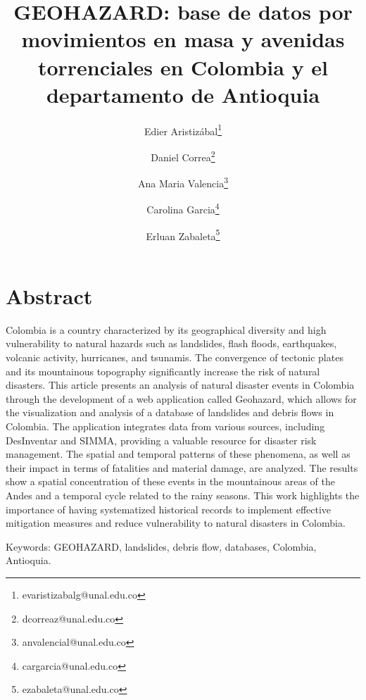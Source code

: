 \documentclass{article}
\title{ \Large \bf GEOHAZARD: base de datos por movimientos en masa y avenidas torrenciales en Colombia y el departamento de Antioquia}
\author[]{Edier Aristizábal\thanks{evaristizabalg@unal.edu.co}}
\author[]{Daniel Correa\thanks{dcorreaz@unal.edu.co}}
\author[]{Ana Maria Valencia\thanks{anvalencial@unal.edu.co}}
\author[]{Carolina Garcia\thanks{cargarcia@unal.edu.co}}
\author[]{Erluan Zabaleta\thanks{ezabaleta@unal.edu.co}}
\affil[]{Departamento de Geociencias y Medio Ambiente, Universidad Nacional de Colombia}
\date{}
\begin{document}
\maketitle

\section*{Abstract}
Colombia is a country characterized by its geographical diversity and high vulnerability to natural hazards such as landslides, flash floods, earthquakes, volcanic activity, hurricanes, and tsunamis. The convergence of tectonic plates and its mountainous topography significantly increase the risk of natural disasters. This article presents an analysis of natural disaster events in Colombia through the development of a web application called Geohazard, which allows for the visualization and analysis of a database of landslides and debris flows in Colombia. The application integrates data from various sources, including DesInventar and SIMMA, providing a valuable resource for disaster risk management. The spatial and temporal patterns of these phenomena, as well as their impact in terms of fatalities and material damage, are analyzed. The results show a spatial concentration of these events in the mountainous areas of the Andes and a temporal cycle related to the rainy seasons. This work highlights the importance of having systematized historical records to implement effective mitigation measures and reduce vulnerability to natural disasters in Colombia.
\par Keywords: GEOHAZARD, landslides, debris flow, databases, Colombia, Antioquia.
\end{document}
